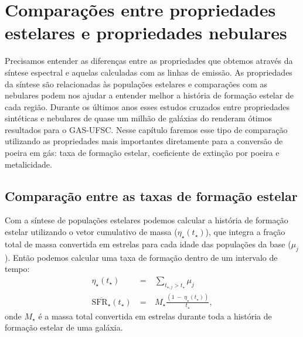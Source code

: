 


\chapter{Comparações entre propriedades estelares e propriedades nebulares}
\label{apendice:synvsneb}

Precisamos entender as diferenças entre as propriedades que obtemos através da síntese espectral e
aquelas calculadas com as linhas de emissão. As propriedades da síntese são relacionadas às
populações estelares e comparações com as nebulares podem nos ajudar a entender melhor a história de
formação estelar de cada região. Durante os últimos anos esses estudos cruzados entre propriedades
sintéticas e nebulares de quase um milhão de galáxias do \SDSS renderam ótimos resultados para o
GAS-UFSC. Nesse capítulo faremos esse tipo de comparação utilizando as propriedades mais importantes
diretamente para a conversão de poeira em gás: taxa de formação estelar, coeficiente de extinção por
poeira e metalicidade.

\section{Comparação entre as taxas de formação estelar}
\label{apendice:synvsneb:SFR}

Com a síntese de populações estelares podemos calcular a história de formação estelar utilizando o
vetor cumulativo de massa ($\eta_\star(t_\star)$), que integra a fração total de massa convertida em
estrelas para cada idade das populações da base ($\mu_j$). Então podemos calcular uma taxa de
formação dentro de um intervalo de tempo:
\begin{eqnarray}
	\eta_\star(t_\star)\ &=&\ \sum\limits_{t_{\star,j} > t_\star} \mu_j \\
	\overline{\mathrm{SFR}_\star}(t_\star)\ &=&\ M_\star \frac{(1\ -\ \eta_\star(t_\star))}{t_\star},
	\label{eq:SFRSyn}
\end{eqnarray}
\noindent onde $M_\star$ é a massa total convertida em estrelas durante toda a história de
formação estelar de uma galáxia.

